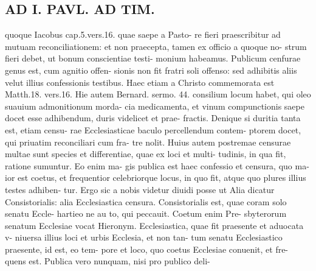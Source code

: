 \documentclass{article}
\begin{document}
\begin{pages}
\section*{AD I. PAVL. AD TIM. }
\marginpar{[ p.320 ]}quoque Iacobus cap.5.vers.16. quae saepe a Pasto- re fieri praescribitur ad mutuam reconciliationem: et non praecepta, tamen ex officio a quoque no- strum fieri debet, ut bonum conscientiae testi- monium habeamus. Publicum cenfurae genus est, cum agnitio offen- sionis non fit fratri soli offenso: sed adhibitis aliis velut illius confessionis testibus. Haec etiam a Christo commemorata est Matth.18. vers.16. Hie autem Bernard. sermo. 44. consilium locum habet, qui oleo suauium admonitionum morda- cia medicamenta, et vinum compunctionis saepe docet esse adhibendum, duris videlicet et prae- fractis. Denique si duritia tanta est, etiam censu- rae Ecclesiasticae baculo percellendum contem- ptorem docet, qui priuatim reconciliari cum fra- tre nolit. Huius autem postremae censurae multae sunt species et differentiae, quae ex loci et multi- tudinis, in qua fit, ratione sumuntur. Eo enim ma- gis publica est haec confessio et censura, quo ma- ior est coetus, et frequentior celebriorque locus, in quo fit, atque quo plures illius testes adhiben- tur. Ergo sic a nobis videtur diuidi posse ut Alia dicatur Consistorialis: alia Ecclesiastica censura. Consistorialis est, quae coram solo senatu Eccle- hartieo ne au to, qui peccauit. Coetum enim Pre- sbyterorum senatum Ecclesiae vocat Hieronym. Ecclesiastica, quae fit praesente et aduocata v- niuersa illius loci et urbis Ecclesia, et non tan- tum senatu Ecclesiastico praesente, id est, eo tem- pore et loco, quo coetus Ecclesiae conuenit, et fre- quens est. Publica vero nunquam, nisi pro publico deli- 

\end{pages}
\end{document}
